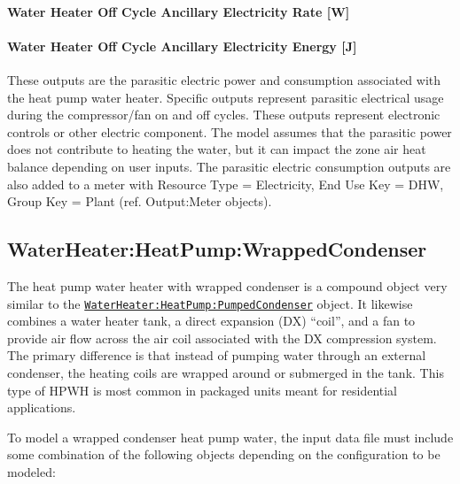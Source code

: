 \paragraph{Water Heater Off Cycle Ancillary Electricity Rate {[}W{]}}\label{water-heater-off-cycle-ancillary-electric-power-w}

\paragraph{Water Heater Off Cycle Ancillary Electricity Energy {[}J{]}}\label{water-heater-off-cycle-ancillary-electric-energy-j}

These outputs are the parasitic electric power and consumption associated with the heat pump water heater. Specific outputs represent parasitic electrical usage during the compressor/fan on and off cycles. These outputs represent electronic controls or other electric component. The model assumes that the parasitic power does not contribute to heating the water, but it can impact the zone air heat balance depending on user inputs. The parasitic electric consumption outputs are also added to a meter with Resource Type = Electricity, End Use Key = DHW, Group Key = Plant (ref. Output:Meter objects).

\subsection{WaterHeater:HeatPump:WrappedCondenser}\label{waterheaterheatpumpwrappedcondenser}

The heat pump water heater with wrapped condenser is a compound object very similar to the \hyperref[waterheaterheatpumppumpedcondenser]{\lstinline!WaterHeater:HeatPump:PumpedCondenser!} object. It likewise combines a water heater tank, a direct expansion (DX) ``coil'', and a fan to provide air flow across the air coil associated with the DX compression system. The primary difference is that instead of pumping water through an external condenser, the heating coils are wrapped around or submerged in the tank. This type of HPWH is most common in packaged units meant for residential applications.

To model a wrapped condenser heat pump water, the input data file must include some combination of the following objects depending on the configuration to be modeled:

